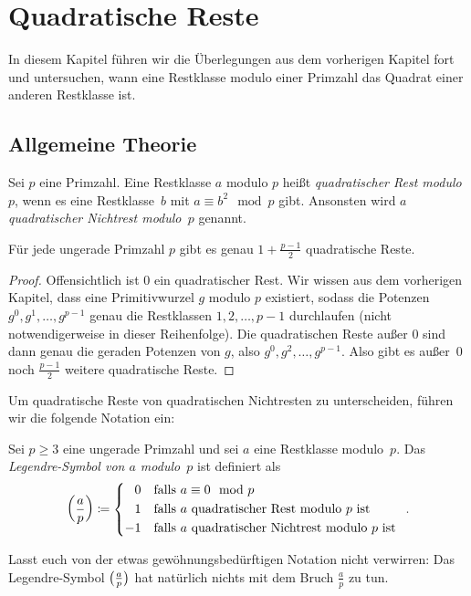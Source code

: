 \section{Quadratische Reste}\label{kapitel:QuadratischeReste}
In diesem Kapitel führen wir die Überlegungen aus dem vorherigen Kapitel fort und untersuchen, wann eine Restklasse modulo einer Primzahl das Quadrat einer anderen Restklasse ist.

\subsection*{Allgemeine Theorie}
\begin{definition}
	Sei $p$ eine Primzahl. Eine Restklasse $a$ modulo $p$ heißt \emph{quadratischer Rest modulo~$p$}, wenn es eine Restklasse~$b$ mit $a\equiv b^2\mod p$ gibt. Ansonsten wird $a$ \emph{quadratischer Nichtrest modulo~$p$} genannt.
\end{definition}
\begin{satzmitnamen}[Lemma]
	Für jede ungerade Primzahl $p$ gibt es genau $1+\frac{p-1}{2}$ quadratische Reste.
\end{satzmitnamen}
\begin{proof}
	Offensichtlich ist $0$ ein quadratischer Rest. Wir wissen aus dem vorherigen Kapitel, dass eine Primitivwurzel $g$ modulo $p$ existiert, sodass die Potenzen $g^0,g^1,\dotsc,g^{p-1}$ genau die Restklassen $1,2,\dotsc,p-1$ durchlaufen (nicht notwendigerweise in dieser Reihenfolge). Die quadratischen Reste außer $0$ sind dann genau die geraden Potenzen von $g$, also $g^0,g^2,\dotsc,g^{p-1}$. Also gibt es außer~$0$ noch $\frac{p-1}{2}$ weitere quadratische Reste.
\end{proof}

Um quadratische Reste von quadratischen Nichtresten zu unterscheiden, führen wir die folgende Notation ein:
\begin{definition}
	Sei $p\geqslant 3$ eine ungerade Primzahl und sei $a$ eine Restklasse modulo~$p$. Das \emph{Legendre-Symbol von $a$ modulo~$p$} ist definiert als
	\begin{equation*}
		\parens*{\frac{a}{p}}\coloneqq\begin{cases*}
			\phantom{-}0 & falls $a\equiv 0\mod p$\\
			\phantom{-}1 & falls $a$ quadratischer Rest modulo $p$ ist\\
			-1 & falls $a$ quadratischer Nichtrest modulo $p$ ist
		\end{cases*}\,.
	\end{equation*}
\end{definition}
Lasst euch von der etwas gewöhnungsbedürftigen Notation nicht verwirren: Das Legendre-Symbol $\parens[\big]{\frac{a}{p}}$ hat natürlich nichts mit dem Bruch $\frac{a}{p}$ zu tun.

